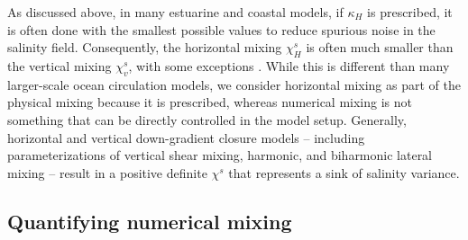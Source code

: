 As discussed above, in many estuarine and coastal models, if $\kappa_H$ is prescribed, it is often done with the smallest possible values to reduce spurious noise in the salinity field. Consequently, the horizontal mixing $\chi_H^s$ is often much smaller \citep{geyer2014estuarine} than the vertical mixing $\chi_v^s$, with some exceptions \citep{Broatch_2022}. While this is different than many larger-scale ocean circulation models, we consider horizontal mixing as part of the physical mixing because it is prescribed, whereas numerical mixing is not something that can be directly controlled in the model setup. Generally, horizontal and vertical down-gradient closure models -- including parameterizations of vertical shear mixing, harmonic, and biharmonic lateral mixing -- result in a positive definite $\chi^s$ that represents a sink of salinity variance.

\subsection{Quantifying numerical mixing}

